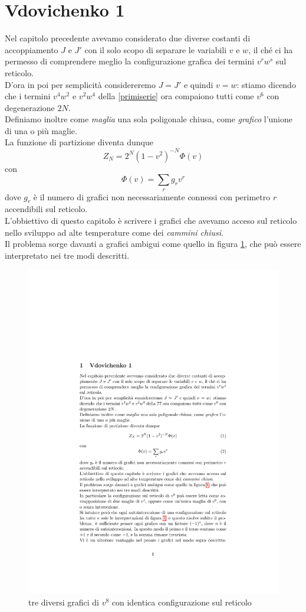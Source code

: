 \documentclass[11pt]{article}
\title{}
\author{}
\date{}
\begin{document}
\maketitle


\section{Vdovichenko 1}
\noindent
Nel capitolo precedente avevamo considerato due diverse costanti di accoppiamento $J$ e $J'$ con il solo scopo di separare le variabili $v$ e $w$, il ché ci ha permesso di comprendere meglio la configurazione grafica dei termini $v^rw^s$ sul reticolo.\\
D'ora in poi per semplicità considereremo $J=J'$ e quindi $v=w$: stiamo dicendo che i termini $v^4w^2$ e $v^2w^4$ della \ref{primiserie} ora compaiono tutti come $v^6$ con degenerazione $2N$. \\
Definiamo inoltre come \emph{maglia} una sola poligonale chiusa, come \emph{grafico} l'unione di una o più maglie.  \\
La funzione di partizione diventa dunque
\begin{equation}\label{enlib}
Z_N=2^N(1-v^2)^{-N}\Phi(v)
\end{equation}
con 
\begin{equation}
\Phi(v)= \sum_r g_r v^r
\end{equation}
dove $g_r$ è il numero di grafici non necessariamente connessi con perimetro $r$ accendibili sul reticolo. \\
L'obbiettivo di questo capitolo è scrivere i grafici che avevamo acceso sul reticolo nello sviluppo ad alte temperature come dei \emph{cammini chiusi}. \\
Il problema sorge davanti a grafici ambigui come quello in figura \ref{v1}, che può essere interpretato nei tre modi descritti.
\begin{figure}[h]
\centering
\includegraphics[width=0.5\columnwidth]{v1}
\caption{tre diversi grafici di $v^8$ con identica configurazione sul reticolo}
\label{v1}
\end{figure}
\end{document}

